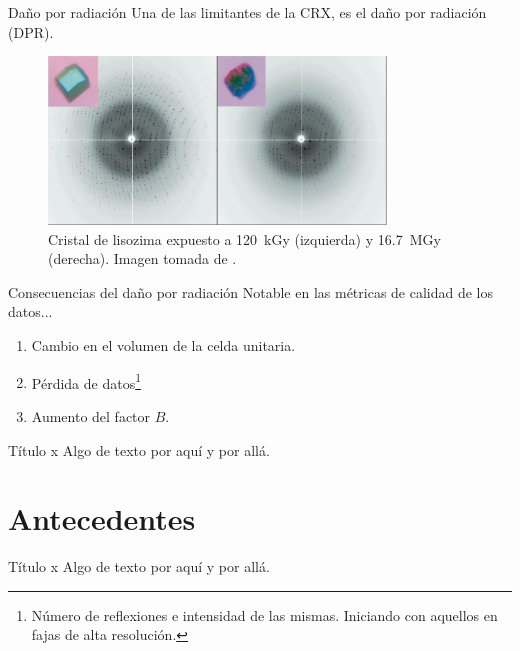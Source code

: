 \documentclass{beamer}
\begin{document}
\begin{frame}{Daño por radiación}
Una de las limitantes de la CRX, es el daño por radiación (DPR). 

\begin{figure}[h]
    \centering
    \includegraphics[width=0.8\textwidth]{teng.png}
    \caption{Cristal de lisozima expuesto a \SI{120}{\kilo\gray} (izquierda) y \SI{16.7}{\mega\gray} (derecha). Imagen tomada de \cite{Teng2000}.}
    \label{fig:mesh1}
\end{figure}

\end{frame}

\begin{frame}{Consecuencias del daño por radiación}
Notable en las métricas de calidad de los datos... 
\begin{enumerate}
	\item Cambio en el volumen de la celda unitaria.
	\item Pérdida de datos\footnote{Número de reflexiones e intensidad de las mismas. Iniciando con aquellos en fajas de alta resolución.}
	\item Aumento del factor $B$. 
\end{enumerate}
\end{frame}

\begin{frame}{Título x}
	Algo de texto por aquí y por allá.
\end{frame}


\section{Antecedentes}

\begin{frame}{Título x}
	Algo de texto por aquí y por allá.
\end{frame}
\end{document}
